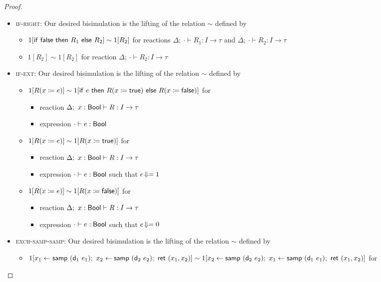 \begin{proof}
\begin{itemize}
\begin{itemize}
\end{itemize}
\item \textsc{if-right}: Our desired bisimulation is the lifting of the relation $\sim$ defined by
\begin{itemize}
\item $1[\mathsf{if} \ \mathsf{false} \ \mathsf{then} \ R_1 \ \mathsf{else} \ R_2] \sim 1[R_2]$ for reactions $\Delta; \ \cdot \vdash R_1 : I \to \tau$ and $\Delta; \ \cdot \vdash R_2 : I \to \tau$
\item $1[R_2] \sim 1[R_2]$ for reaction $\Delta; \ \cdot \vdash R_2 : I \to \tau$
\end{itemize}
\item \textsc{if-ext}: Our desired bisimulation is the lifting of the relation $\sim$ defined by
\begin{itemize}
\item $1[R(x \coloneqq e)] \sim 1[\mathsf{if} \ e \ \mathsf{then} \ R(x \coloneqq \mathsf{true}) \ \mathsf{else} \ R(x \coloneqq \mathsf{false})]$ for
\begin{itemize}
\item reaction $\Delta; \ x : \mathsf{Bool} \vdash R : I \to \tau$
\item expression $\cdot \vdash e : \mathsf{Bool}$
\end{itemize}
\item $1[R(x \coloneqq e)] \sim 1[R(x \coloneqq \mathsf{true})]$ for
\begin{itemize}
\item reaction $\Delta; \ x : \mathsf{Bool} \vdash R : I \to \tau$
\item expression $\cdot \vdash e : \mathsf{Bool}$ such that $e \! \Downarrow = 1$
\end{itemize}
\item $1[R(x \coloneqq e)] \sim 1[R(x \coloneqq \mathsf{false})]$ for
\begin{itemize}
\item reaction $\Delta; \ x : \mathsf{Bool} \vdash R : I \to \tau$
\item expression $\cdot \vdash e : \mathsf{Bool}$ such that $e \! \Downarrow = 0$
\end{itemize}
\end{itemize}
\item \textsc{exch-samp-samp}: Our desired bisimulation is the lifting of the relation $\sim$ defined by
\begin{itemize}
\item $1[x_1 \leftarrow \samp{(\dist_1 \ e_1)}; \ x_2 \leftarrow \samp{(\dist_2 \ e_2)}; \ \ret{(x_1,x_2)}] \sim \\ 1[x_2 \leftarrow \samp{(\dist_2 \ e_2)}; \ x_1 \leftarrow \samp{(\dist_1 \ e_1)}; \ \ret{(x_1,x_2)}]$ for

\end{itemize}
\end{itemize}
\end{proof}

